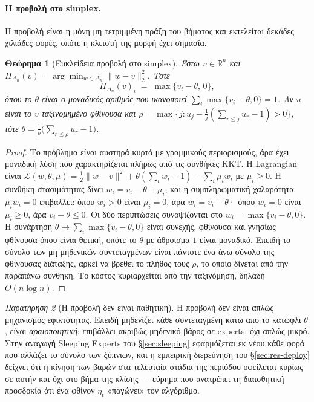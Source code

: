 \documentclass[12pt,a4paper,oneside]{report}
\renewcommand{\_}{\oldunderscore\allowbreak}
\theoremstyle{definition}
\theoremstyle{plain}
\newtheorem{theorem}{Θεώρημα}[chapter]
\theoremstyle{remark}
\newtheorem{remark}[theorem]{Παρατήρηση}
\begin{document}
\paragraph{Η προβολή στο simplex.} Η προβολή είναι η μόνη μη τετριμμένη πράξη του βήματος
και εκτελείται δεκάδες χιλιάδες φορές, οπότε η κλειστή της μορφή έχει σημασία.

\begin{theorem}[Ευκλείδεια προβολή στο simplex]
\label{thm:projection}
Έστω $v \in \mathbb{R}^n$ και $\Pi_{\Delta_n}(v) = \arg\min_{w\in\Delta_n}\|w-v\|_2^2$. Τότε
\[
\Pi_{\Delta_n}(v)_i \;=\; \max\{v_i - \theta,\, 0\},
\]
όπου το $\theta$ είναι ο μοναδικός αριθμός που ικανοποιεί $\sum_i \max\{v_i-\theta,0\} = 1$.
Αν $u$ είναι το $v$ ταξινομημένο φθίνουσα και
$\rho = \max\{j : u_j - \frac{1}{j}(\sum_{r\leq j} u_r - 1) > 0\}$, τότε
$\theta = \frac{1}{\rho}\big(\sum_{r\leq\rho} u_r - 1\big)$.
\end{theorem}

\begin{proof}
Το πρόβλημα είναι αυστηρά κυρτό με γραμμικούς περιορισμούς, άρα έχει μοναδική λύση που
χαρακτηρίζεται πλήρως από τις συνθήκες KKT. Η Lagrangian είναι
$\mathcal{L}(w,\theta,\mu) = \tfrac12\|w-v\|^2 + \theta(\sum_i w_i - 1) - \sum_i \mu_i w_i$
με $\mu_i \geq 0$. Η συνθήκη στασιμότητας δίνει $w_i = v_i - \theta + \mu_i$, και η
συμπληρωματική χαλαρότητα $\mu_i w_i = 0$ επιβάλλει: όπου $w_i>0$ είναι $\mu_i=0$, άρα
$w_i = v_i-\theta$· όπου $w_i=0$ είναι $\mu_i \geq 0$, άρα $v_i-\theta \leq 0$. Οι δύο
περιπτώσεις συνοψίζονται στο $w_i = \max\{v_i-\theta,0\}$. Η συνάρτηση
$\theta \mapsto \sum_i \max\{v_i-\theta,0\}$ είναι συνεχής, φθίνουσα και γνησίως φθίνουσα
όπου είναι θετική, οπότε το $\theta$ με άθροισμα $1$ είναι μοναδικό. Επειδή το σύνολο των μη
μηδενικών συντεταγμένων είναι πάντοτε ένα άνω σύνολο της φθίνουσας διάταξης, αρκεί να βρεθεί
το πλήθος τους $\rho$, το οποίο δίνεται από την παραπάνω συνθήκη. Το κόστος κυριαρχείται από
την ταξινόμηση, δηλαδή $O(n\log n)$.
\end{proof}

\begin{remark}[Η προβολή δεν είναι παθητική]
Η προβολή δεν είναι απλώς μηχανισμός εφικτότητας. Επειδή μηδενίζει κάθε συντεταγμένη κάτω
από το κατώφλι $\theta$, είναι \emph{αραιοποιητική}: επιβάλλει ακριβώς μηδενικό βάρος σε
experts, όχι απλώς μικρό. Στην αναγωγή Sleeping Experts του \S\ref{sec:sleeping} εφαρμόζεται
εκ νέου κάθε φορά που αλλάζει το σύνολο των ξύπνιων, και η εμπειρική διερεύνηση του
\S\ref{sec:res-deploy} δείχνει ότι η κίνηση των βαρών στα τελευταία στάδια της περιόδου
οφείλεται κυρίως σε αυτήν και όχι στο βήμα της κλίσης --- εύρημα που ανατρέπει τη διαισθητική
προσδοκία ότι ένα φθίνον $\eta_t$ «παγώνει» τον αλγόριθμο.
\end{remark}
\end{document}
